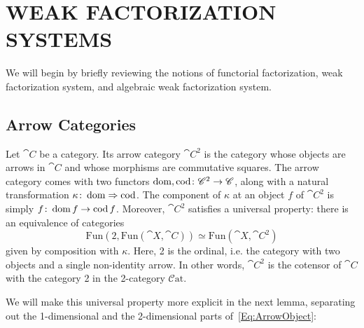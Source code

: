 
\chapter{WEAK FACTORIZATION SYSTEMS}\label{Ch:Wfs}

We will begin by briefly reviewing the notions of functorial factorization, weak factorization system, and algebraic weak factorization system. 

\section{Arrow Categories}

Let $\cat{C}$ be a category. Its arrow category $\cat{C}^2$ is the category whose objects are arrows in $\cat{C}$ and whose morphisms are commutative squares. The arrow category comes with two functors $\operatorname{dom},\operatorname{cod}\colon \mathscr{C}^2\to\mathscr{C}$, along with a natural transformation $\kappa\colon\operatorname{dom}\Rightarrow\operatorname{cod}$. The component of $\kappa$ at an object $f$ of $\cat{C}^2$ is simply $f\colon\operatorname{dom} f\to\operatorname{cod} f$. Moreover, $\cat{C}^2$ satisfies a universal property: there is an equivalence of categories
\begin{equation}\label{Eq:ArrowObject}
	\mathrm{Fun}(2,\mathrm{Fun}(\cat{X},\cat{C}))\simeq\mathrm{Fun}(\cat{X},\cat{C}^2)
\end{equation}
given by composition with $\kappa$. Here, 2 is the ordinal, i.e. the category with two objects and a single non-identity arrow. In other words, $\cat{C}^2$ is the cotensor of $\cat{C}$ with the category 2 in the 2-category $\mathcal{C}\mathrm{at}$.

We will make this universal property more explicit in the next lemma, separating out the 1-dimensional and the 2-dimensional parts of~\eqref{Eq:ArrowObject}:

